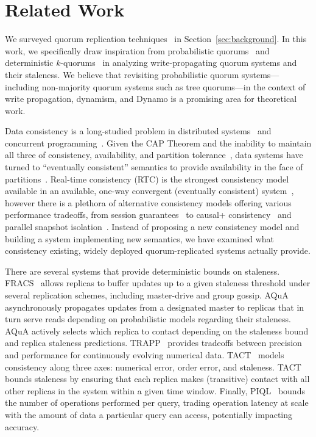 \documentclass{vldb}
\begin{document}
\section{Related Work}
\label{sec:relatedwork}

We surveyed quorum replication
techniques~\cite{prob-quorum-dynamic, treequorum,non-strict,
  multi-k-quorum, quorums-start, quorum-placement, partitionedquorum, quorums-alternative, prob-quorum,
  quorum-overview, quorumsystems} in Section~\ref{sec:background}.  In
this work, we specifically draw inspiration from probabilistic
quorums~\cite{prob-quorum} and deterministic
$k$-quorums~\cite{multi-k-quorum, non-strict} in analyzing
write-propagating quorum systems and their staleness.  We believe that
revisiting probabilistic quorum systems---including non-majority
quorum systems such as tree quorums---in the context of write
propagation, dynamism, and Dynamo is a promising area for theoretical
work.

Data consistency is a long-studied problem in distributed
systems~\cite{consistency-partitioned, danger-rep} and concurrent
programming~\cite{linearizability}.  Given the CAP Theorem and the
inability to maintain all three of consistency, availability, and
partition tolerance~\cite{cap-proof}, data systems have turned to
``eventually consistent'' semantics to provide availability in the
face of partitions~\cite{consistency-partitioning, vogels-defs}.
Real-time consistency (RTC) is the strongest consistency model
available in an available, one-way convergent (eventually consistent)
system~\cite{rtc-proof}, however there is a plethora of alternative
consistency models offering various performance tradeoffs, from
session guarantees~\cite{sessionguarantees} to causal+
consistency~\cite{cops} and parallel snapshot isolation~\cite{walter}.
Instead of proposing a new consistency model and building a system
implementing new semantics, we have examined what consistency
existing, widely deployed quorum-replicated systems actually provide.

There are several systems that provide deterministic bounds on
staleness.  FRACS~\cite{frac} allows replicas to buffer updates up to
a given staleness threshold under several replication schemes,
including master-drive and group gossip.  AQuA~\cite{aqua}
asynchronously propagates updates from a designated master to replicas
that in turn serve reads depending on probabilistic models regarding
their staleness.  AQuA actively selects which replica to contact
depending on the staleness bound and replica staleness predictions.
TRAPP~\cite{trapp} provides tradeoffs between precision and
performance for continuously evolving numerical data.
TACT~\cite{vahdat-article, vahdat-bounded} models consistency along
three axes: numerical error, order error, and staleness.  TACT bounds
staleness by ensuring that each replica makes (transitive) contact
with all other replicas in the system within a given time window.
Finally, PIQL~\cite{piql} bounds the number of operations performed
per query, trading operation latency at scale with the amount of data
a particular query can access, potentially impacting accuracy.
\end{document}
